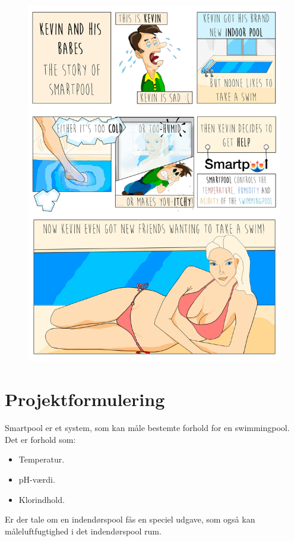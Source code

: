 \begin{figure}
	\centering
	\includegraphics[width=0.99\linewidth]{figs/kevin.png}
	\label{fig:kevin}
\end{figure}

\newpage

\section{Projektformulering}
Smartpool er et system, som kan måle bestemte forhold for en swimmingpool. 
Det er forhold som:
\begin{itemize}
	\item Temperatur.
	\item pH-værdi.
	\item Klorindhold.
\end{itemize}

Er der tale om en indendørspool fås en speciel udgave, som også kan måleluftfugtighed i det indendørspool rum.

